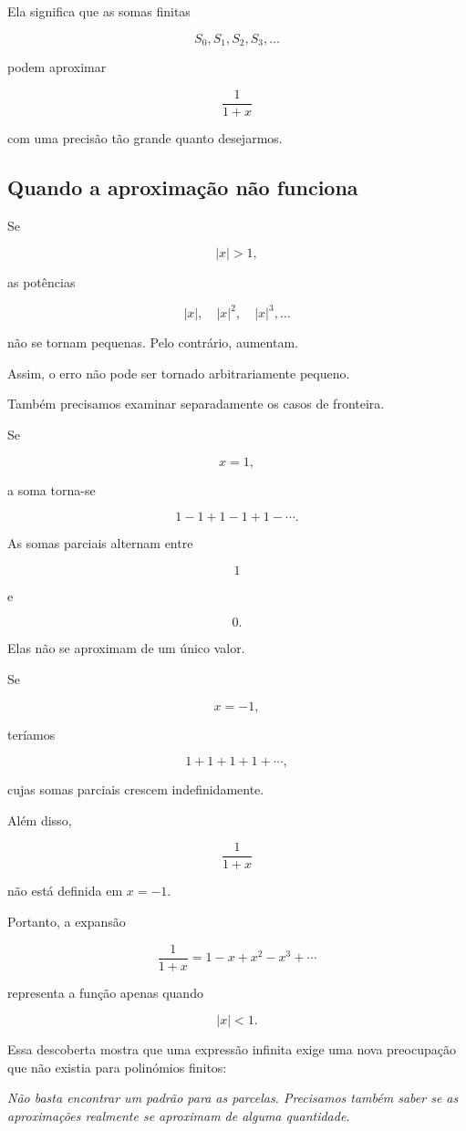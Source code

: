 \documentclass[12pt,a4paper]{article}
\begin{document}
Ela significa que as somas finitas

\[
S_0,S_1,S_2,S_3,\ldots
\]

podem aproximar

\[
\frac{1}{1+x}
\]

com uma precisão tão grande quanto desejarmos.

\subsection{Quando a aproximação não funciona}

Se

\[
|x|>1,
\]

as potências

\[
|x|,\quad |x|^2,\quad |x|^3,\ldots
\]

não se tornam pequenas. Pelo contrário, aumentam.

Assim, o erro não pode ser tornado arbitrariamente pequeno.

Também precisamos examinar separadamente os casos de fronteira.

Se

\[
x=1,
\]

a soma torna-se

\[
1-1+1-1+1-\cdots.
\]

As somas parciais alternam entre

\[
1
\]

e

\[
0.
\]

Elas não se aproximam de um único valor.

Se

\[
x=-1,
\]

teríamos

\[
1+1+1+1+\cdots,
\]

cujas somas parciais crescem indefinidamente.

Além disso,

\[
\frac{1}{1+x}
\]

não está definida em \(x=-1\).

Portanto, a expansão

\[
\frac{1}{1+x}
=
1-x+x^2-x^3+\cdots
\]

representa a função apenas quando

\[
|x|<1.
\]

Essa descoberta mostra que uma expressão infinita exige uma nova
preocupação que não existia para polinómios finitos:

\begin{center}
\emph{Não basta encontrar um padrão para as parcelas. Precisamos também
saber se as aproximações realmente se aproximam de alguma quantidade.}
\end{center}
\end{document}
